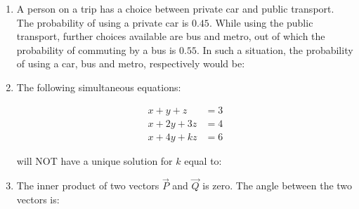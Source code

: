 \documentclass[journal]{IEEEtran}
\begin{document}
\begin{enumerate}
\item A person on a trip has a choice between private car and public transport. The probability of using a private car is $0.45$. While using the public transport, further choices available are bus and metro, out of which the probability of commuting by a bus is $0.55$. In such a situation, the probability  of using a car, bus and metro, respectively would be: \hfill {}
\begin{enumerate}
\end{enumerate}

\item The following simultaneous equations: 

\begin{align}
x + y + z &= 3 \\
x + 2y + 3z &= 4 \\
x + 4y + kz &= 6
\end{align}

will NOT have a unique solution for $k$ equal to: \hfill {}
\begin{enumerate}
\end{enumerate}

\item The inner  product of two vectors $\vec{P}$ and $\vec{Q}$ is zero. The angle  between the two vectors is: \hfill {}
\begin{enumerate}
\end{enumerate}


\end{enumerate}
\end{document}
